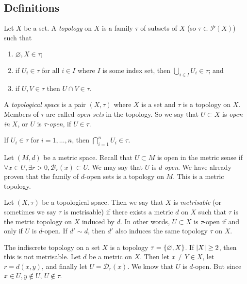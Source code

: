 \subsection{Definitions}
\begin{definition}
	Let \( X \) be a set.
	A \textit{topology} on \( X \) is a family \( \tau \) of subsets of \( X \) (so \( \tau \subset \mathcal P(X) \)) such that
	\begin{enumerate}
		\item \( \varnothing, X \in \tau \);
		\item if \( U_i \in \tau \) for all \( i \in I \) where \( I \) is some index set, then \( \bigcup_{i \in I} U_i \in \tau \); and
		\item if \( U, V \in \tau \) then \( U \cap V \in \tau \).
	\end{enumerate}
	A \textit{topological space} is a pair \( (X, \tau) \) where \( X \) is a set and \( \tau \) is a topology on \( X \).
	Members of \( \tau \) are called \textit{open sets} in the topology.
	So we say that \( U \subset X \) is \textit{open in} \( X \), or \( U \) is \( \tau \)\textit{-open}, if \( U \in \tau \).
\end{definition}
\begin{remark}
	If \( U_i \in \tau \) for \( i = 1, \dots, n \), then \( \bigcap_{i=1}^n U_i \in \tau \).
\end{remark}
\begin{example}
	Let \( (M, d) \) be a metric space.
	Recall that \( U \subset M \) is open in the metric sense if \( \forall x \in U, \exists r > 0, \mathcal B_r(x) \subset U \).
	We may say that \( U \) is \( d \)\textit{-open}.
	We have already proven that the family of \( d \)-open sets is a topology on \( M \).
	This is a metric topology.
\end{example}
\begin{definition}
	Let \( (X, \tau) \) be a topological space.
	Then we say that \( X \) is \textit{metrisable} (or sometimes we say \( \tau \) is metrisable) if there exists a metric \( d \) on \( X \) such that \( \tau \) is the metric topology on \( X \) induced by \( d \).
	In other words, \( U \subset X \) is \( \tau \)-open if and only if \( U \) is \( d \)-open.
	If \( d' \sim d \), then \( d' \) also induces the same topology \( \tau \) on \( X \).
\end{definition}
\begin{example}
	The indiscrete topology on a set \( X \) is a topology \( \tau = \qty{ \varnothing, X } \).
	If \( \abs{X} \geq 2 \), then this is not metrisable.
	Let \( d \) be a metric on \( X \).
	Then let \( x \neq Y \in X \), let \( r = d(x,y) \), and finally let \( U = \mathcal D_r(x) \).
	We know that \( U \) is \( d \)-open.
	But since \( x \in U, y \not\in U \), \( U \not\in \tau \).
\end{example}
